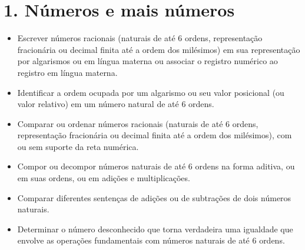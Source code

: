 \chapter{1. Números e mais números}



\begin{itemize}
\item Escrever números racionais (naturais de até 6 ordens, representação
fracionária ou decimal finita até a ordem dos milésimos) em sua
representação por algarismos ou em língua materna ou associar o registro
numérico ao registro em língua materna.

\item Identificar a ordem ocupada por um algarismo ou seu valor posicional
(ou valor relativo) em um número natural de até 6 ordens.

\item Comparar ou ordenar números racionais (naturais de até 6 ordens,
representação fracionária ou decimal finita até a ordem dos milésimos),
com ou sem suporte da reta numérica.

\item Compor ou decompor números naturais de até 6 ordens na forma aditiva,
ou em suas ordens, ou em adições e multiplicações.

\item Comparar diferentes sentenças de adições ou de subtrações de dois
números naturais.

\item Determinar o número desconhecido que torna verdadeira uma igualdade
que envolve as operações fundamentais com números naturais de até 6
ordens.
\end{itemize}



